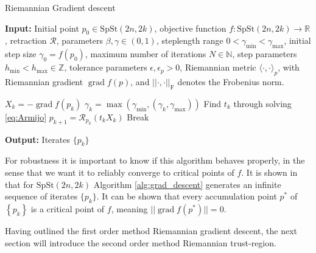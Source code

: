 \begin{algorithm}[H]
    \caption{Riemannian Gradient descent}\label{alg:grad_descent}
    \textbf{Input:} Initial point $p_{0}\in \mathrm{SpSt}(2n, 2k)$, objective function $f\colon\mathrm{SpSt}(2n, 2k)\to \mathbb{R}$, retraction $\mathcal{R}$, parameters $\beta, \gamma \in(0,1)$, steplength range $0<\gamma_{\text{min}}<\gamma_{\text{max}}$, initial step size $\gamma_{0}=f(p_{0})$, maximum number of iterations $N\in \mathbb{N}$, step parameters $h_{\text{min}}<h_{\text{max}}\in \mathbb{Z}$, tolerance parameters $\epsilon, \epsilon_{p}>0$, Riemannian metric $\langle \cdot,\cdot \rangle_{p}$, with Riemannian gradient $\operatorname{grad}f(p)$, and $\lvert \lvert \cdot,\cdot \rvert  \rvert_{\text{F}}$ denotes the Frobenius norm.
    \begin{algorithmic}[1]
        \State $X_{k}=-\operatorname{grad}f(p_{k})$
        \State $\gamma_{k}=\operatorname{max}(\gamma_{\text{min}},(\gamma_{k}, \gamma_{\text{max}}))$
        \State Find $t_{k}$ through solving \eqref{eq:Armijo}
        \State $p_{k+1}=\mathcal{R}_{p_{k}}(t_{k}X_{k})$
        \State Break
        \EndIf
        \EndFor
    \end{algorithmic}
    \textbf{Output:} Iterates $\{p_{k}\}$
\end{algorithm}

For robustness it is important to know if this algorithm behaves properly, in the sense that we want it to reliably converge to critical points of $f$. It is shown in \cite[Cor.~5.8]{GaoSonAbsilStykel2021} that for $\mathrm{SpSt}(2n, 2k)$ Algorithm \ref{alg:grad_descent} generates an infinite sequence of iterates $\{p_{k}\} $\cite[Prop.~5.6]{GaoSonAbsilStykel2021}. It can be shown that every accumulation point $p^*$ of $\left\{ p_{k} \right\}$ is a critical point of $f$, meaning $\lvert \lvert\operatorname{grad}f(p^{*})\rvert \rvert=0$. 

Having outlined the first order method Riemannian gradient descent, the next section will introduce the second order method Riemannian trust-region.